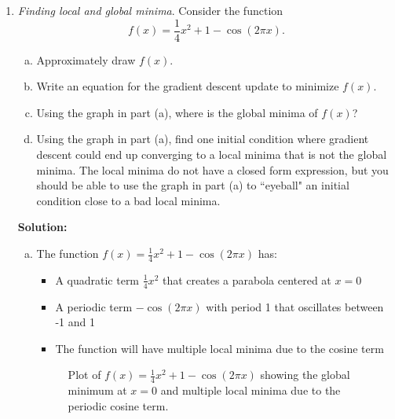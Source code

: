 \documentclass[11pt]{article}
\begin{document}
\begin{enumerate}
\begin{enumerate}[(a)]
\begin{python}
    return J, Jgrada, Jgradb
\end{python}
\end{enumerate}

\item \emph{Finding local and global minima}.  Consider the function
\[
    f(x) = \frac{1}{4}x^2 + 1 - \cos(2\pi x).
\]
\begin{enumerate}[(a)]
\item Approximately draw $f(x)$.
\item Write an equation for the gradient descent update to minimize $f(x)$.
\item Using the graph in part (a), where is the global minima of $f(x)$?
\item Using the graph in part (a), find one initial condition where gradient descent
could end up converging to a local minima that is not the global minima.
The local minima do not have a closed form expression, but you should be
able to use the graph in part (a) to ``eyeball" an initial condition close to
a bad local minima.
\end{enumerate}

\textbf{Solution:}
\begin{enumerate}[(a)]
\item The function $f(x) = \frac{1}{4}x^2 + 1 - \cos(2\pi x)$ has:
\begin{itemize}
\item A quadratic term $\frac{1}{4}x^2$ that creates a parabola centered at $x=0$
\item A periodic term $-\cos(2\pi x)$ with period 1 that oscillates between -1 and 1
\item The function will have multiple local minima due to the cosine term
\end{itemize}

\begin{figure}[H]
\centering
{}
\caption{Plot of $f(x) = \frac{1}{4}x^2 + 1 - \cos(2\pi x)$ showing the global minimum at $x=0$ and multiple local minima due to the periodic cosine term.}
\end{figure}


\end{enumerate}
\end{enumerate}
\end{document}
